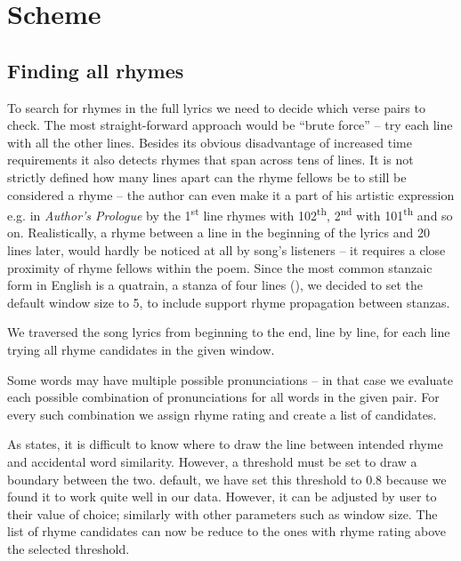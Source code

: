 \section{Scheme}
\subsection{Finding all rhymes}\label{finding-all-rhymes}
To search for rhymes in the full lyrics\added{,} we need to decide which verse pairs to check. The most straight-forward approach would be ``brute force'' -- try each line with all the other lines. Besides its obvious disadvantage of increased time requirements it also detects rhymes that span across tens of lines. It is not strictly defined how many lines apart can the rhyme fellows be to still be considered a rhyme -- the author can even make it a part of his artistic expression\added{,} e.g. in \textit{Author's Prologue} by \cite{thomas1952author} the 1\textsuperscript{st} line rhymes with 102\textsuperscript{th}, 2\textsuperscript{nd} with 101\textsuperscript{th} and so on. Realistically, a rhyme between a line in the beginning of the lyrics and 20 lines later, would hardly be noticed at all by song's listeners -- it requires a close proximity of rhyme fellows within the poem. Since the most common stanzaic form in English is a quatrain, a stanza of four lines (\cite{eastman1970norton}), we decided to set the default window size to 5, to include support  rhyme propagation between stanzas.

We traversed the song lyrics from beginning to the end, line by line, for each line trying all rhyme candidates in the given window.

Some words may have multiple possible pronunciations -- in that case we evaluate each possible combination of pronunciations for all words in the given pair. For every such combination we assign rhyme rating and create a list of candidates.

As \cite{rhymes_overview} states, it is difficult to know where to draw the line between intended rhyme and accidental word similarity. However, a threshold must be set to draw a boundary between the two.  default, we have set this threshold to 0.8 because we found it to work quite well in our data. However, it can be adjusted by user to their value of choice; similarly with other parameters such as window size. The list of rhyme candidates can now be reduce to the ones with rhyme rating above the selected threshold.

